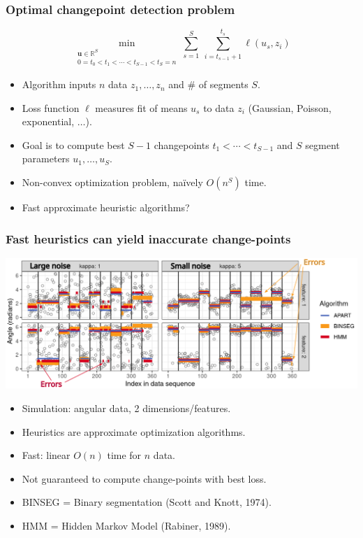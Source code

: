 \documentclass{beamer}
\newcommand{\RR}{\mathbb R}
\begin{document}
\begin{frame}
  \frametitle{Optimal changepoint detection problem}
  
  \vskip -1cm    
$$
\min_{\substack{
  \mathbf u\in\RR^{S}
\\
   0=t_0<t_1<\cdots<t_{S-1}<t_S=n
  }} 
    \sum_{s=1}^S\  \sum_{i=t_{s-1}+1}^{t_s} \ell( u_s,  z_i) 
$$
\begin{itemize}
  \item Algorithm inputs $n$ data $z_1, \dots, z_n$ and \# of segments $S$.
  \item Loss function $\ell$ measures fit of means $u_s$ to data $z_i$ (Gaussian, Poisson, exponential, $\dots$).
  \item Goal is to compute best $S-1$ changepoints
    $t_1 < \cdots < t_{S-1}$ and $S$ segment parameters $u_1,\dots,u_S$.
  \item Non-convex optimization problem, na\" ively $O(n^S)$ time.
  \item Fast approximate heuristic algorithms?
  \end{itemize}
\end{frame}

\begin{frame}
  \frametitle{Fast heuristics can yield inaccurate change-points}
  \includegraphics[width=\textwidth]{figure-2d-hmm-sim-noise-many-errors}
  \begin{itemize}
  \item Simulation: angular data, 2 dimensions/features.
  \item Heuristics are approximate optimization algorithms.
  \item Fast: linear $O(n)$ time for $n$ data.
  \item Not guaranteed to compute change-points with best loss.
  \item BINSEG = Binary segmentation (Scott and Knott, 1974).
  \item HMM = Hidden Markov Model (Rabiner, 1989).
  \end{itemize}
\end{frame}
\end{document}
